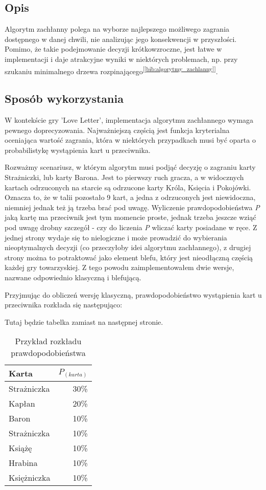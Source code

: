 \subsection{Opis}
Algorytm zachłanny polega na wyborze najlepszego możliwego zagrania dostępnego w danej chwili, nie analizując jego konsekwencji w przyszłości. Pomimo, że takie podejmowanie decyzji krótkowzroczne, jest łatwe w implementacji i daje atrakcyjne wyniki w niektórych problemach, np. przy szukaniu minimalnego drzewa rozpinającego\textsuperscript{[\ref{bib:algorytmy_zachlanny}]}.

\subsection{Sposób wykorzystania}

W kontekście gry 'Love Letter', implementacja algorytmu zachłannego wymaga pewnego doprecyzowania. Najważniejszą częścią jest funkcja kryterialna oceniająca wartość zagrania, która w niektórych przypadkach musi być oparta o probabilistykę wystąpienia kart u przeciwnika. 

Rozważmy scenariusz, w którym algorytm musi podjąć decyzję o zagraniu karty Strażniczki, lub karty Barona. Jest to pierwszy ruch gracza, a w widocznych kartach odrzuconych na starcie są odrzucone karty Króla, Księcia i Pokojówki. Oznacza to, że w talii pozostało 9 kart, a jedna z odrzuconych jest niewidoczna, niemniej jednak też ją trzeba brać pod uwagę. Wyliczenie prawdopodobieństwa \textit{P} jaką kartę ma przeciwnik jest tym momencie proste, jednak trzeba jeszcze wziąć pod uwagę drobny szczegół - czy do liczenia \textit{P} wliczać karty posiadane w ręce. Z jednej strony wydaje się to nielogiczne i może prowadzić do wybierania nieoptymalnych decyzji (co przeczyłoby idei algorytmu zachłannego), z drugiej strony można to potraktować jako element blefu, który jest nieodłączną częścią każdej gry towarzyskiej. Z tego powodu zaimplementowałem dwie wersje, nazwane odpowiednio klasyczną i blefującą.

Przyjmując do obliczeń wersję klasyczną, prawdopodobieństwo wystąpienia kart u przeciwnika rozkłada się następująco:


\begin{center}
	Tutaj będzie tabelka zamiast na następnej stronie. %
\end{center}

\clearpage
\begin{table}[t]
	\caption{Przykład rozkładu prawdopodobieństwa}
	\centering
		\begin{tabular}{|l|r|}
			\hline
			Karta & $P_{(karta)}$	\\ \hline
			Strażniczka & 30\% 			\\ \hline
			Kapłan & 20\% 				\\ \hline
			Baron & 10\% 				\\ \hline
			Strażniczka & 10\% 			\\ \hline
			Książę & 10\% 				\\ \hline
			Hrabina & 10\% 				\\ \hline
			Księżniczka & 10\% 			\\ \hline
		\end{tabular}
\end{table}

